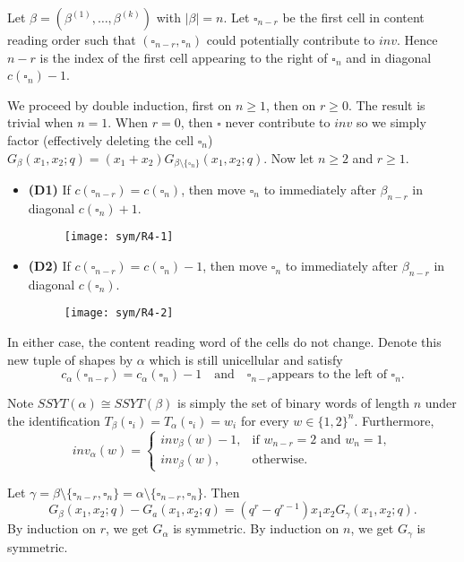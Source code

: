 Let $\beta = (\beta^{(1)}, \dots, \beta^{(k)})$ with $|\beta| = n$. Let
$\square_{n-r}$ be the first cell in content reading order such that
$(\square_{n-r}, \square_{n})$ could potentially contribute to $inv$.  Hence
$n-r$ is the index of the first cell appearing to the right of
$\square_{n}$ and in diagonal $c(\square_{n})-1$.

We proceed by double induction, first on $n \ge 1$, then on $r \ge 0$.
The result is trivial when $n=1$.  When $r = 0$, then $\square$ never
contribute to $inv$ so we simply factor (effectively deleting the cell
$\square_{n}$)
$G_{\beta}(x_{1},x_{2};q) = (x_{1}+x_{2})G_{\beta \setminus \{\square_{n}\}}(x_{1},x_{2}; q)$.
Now let $n \ge 2$ and $r \ge 1$.

\begin{itemize}
\item \textbf{(D1)} If $c(\square_{n-r}) = c(\square_{n})$, then move
  $\square_{n}$ to immediately after $\beta_{n-r}$ in diagonal $c(\square_{n})+1$.
  \begin{figure}[H]
    \centering
    \texttt{[image: sym/R4-1]}
  \end{figure}

\item \textbf{(D2)} If $c(\square_{n-r}) = c(\square_{n}) - 1$, then move
  $\square_{n}$ to immediately after $\beta_{n-r}$ in diagonal $c(\square_{n})$.
  \begin{figure}[H]
    \centering
    \texttt{[image: sym/R4-2]}
  \end{figure}
\end{itemize}
In either case, the content reading word of the cells do not change.
Denote this new tuple of shapes by $\alpha$ which is still unicellular and
satisfy
\[
  c_{\alpha}(\square_{n-r}) = c_{\alpha}(\square_{n}) - 1 \quad\textrm{and}\quad \square_{n-r} \textrm{
    appears to the left of } \square_{n}.
\]

Note $SSYT(\alpha) \cong SSYT(\beta)$ is simply the set of binary words of length
$n$ under the identification
$T_{\beta}(\square_{i}) = T_{\alpha}(\square_{i}) = w_{i}$ for every
$w \in \{1,2\}^{n}$.  Furthermore,
\[
  inv_{\alpha}(w) =
  \begin{cases}
    inv_{\beta}(w) - 1, &\textrm{if } w_{n-r} = 2 \textrm{ and } w_{n} = 1, \\
    inv_{\beta}(w), &\textrm{otherwise}.
  \end{cases}
\]

Let $\gamma = \beta \setminus \{\square_{n-r},\square_{n}\} = \alpha \setminus \{\square_{n-r},\square_{n}\}$. Then
\[
  G_{\beta}(x_{1},x_{2}; q) - G_{a}(x_{1}, x_{2}; q) = (q^{r} - q^{r-1})
  x_{1}x_{2} G_{\gamma}(x_{1},x_{2};q).
\]
By induction on $r$, we get $G_{\alpha}$ is symmetric.  By induction on
$n$, we get $G_{\gamma}$ is symmetric.

